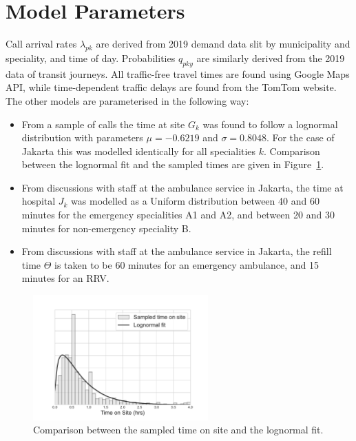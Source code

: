 \documentclass[preprint,12pt]{elsarticle}
\begin{document}
\section{Model Parameters} \label{apx:parameters}
Call arrival rates $\lambda_{pk}$ are derived from 2019 demand data slit by municipality and speciality, and time of day. Probabilities $q_{pky}$ are similarly derived from the 2019 data of transit journeys. All traffic-free travel times are found using Google Maps API, while time-dependent traffic delays are found from the TomTom website. The other models are parameterised in the following way:
\begin{itemize}
  \item From a sample of calls the time at site $G_k$ was found to follow a lognormal distribution with parameters $\mu = -0.6219$ and $\sigma = 0.8048$. For the case of Jakarta this was modelled identically for all specialities $k$. Comparison between the lognormal fit and the sampled times are given in Figure~\ref{fig:lognorm_fit}.
  \item From discussions with staff at the ambulance service in Jakarta, the time at hospital $J_k$ was modelled as a Uniform distribution between 40 and 60 minutes for the emergency specialities A1 and A2, and between 20 and 30 minutes for non-emergency speciality B.
  \item From discussions with staff at the ambulance service in Jakarta, the refill time $\Theta$ is taken to be 60 minutes for an emergency ambulance, and 15 minutes for an RRV.
\end{itemize}

\begin{figure}[ht]
\centering
  \includegraphics[width=0.6\textwidth]{img/time_on_site_fit.pdf}
    \caption{Comparison between the sampled time on site and the lognormal fit.}
  \label{fig:lognorm_fit}
\end{figure}





\end{document}
